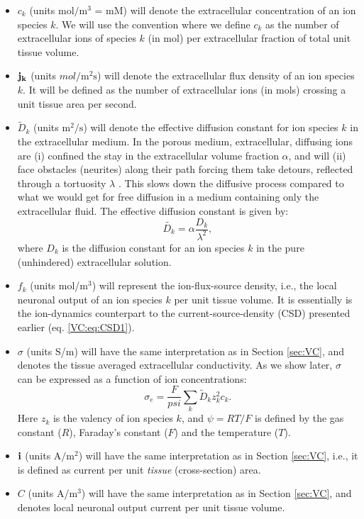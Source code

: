 \begin{itemize}
\item $c_k$ (units $\mathrm{mol/m^3}$ = mM) will denote the extracellular concentration of an ion species $k$. We will use the convention where we define $c_k$ as the number of extracellular ions of species $k$ (in mol) per extracellular fraction of total unit tissue volume. 

\item ${\bf j_k}$ (units $mol/\mathrm{m^2s}$) will denote the extracellular flux density of an ion species $k$. It will be defined as the number of extracellular ions (in mols) crossing a unit tissue area per second. 

\item $\tilde{D}_k$ (units $\mathrm{m^2/s}$) will denote the effective diffusion constant for ion species $k$ in the extracellular medium. In the porous medium, extracellular, diffusing ions are (i) confined the stay in the extracellular volume fraction $\alpha$, and will (ii) face obstacles (neurites) along their path forcing them take detours, reflected through a tortuosity $\lambda$ \citep{Nicholson1998}. This slows down the diffusive process compared to what we would get for free diffusion in a medium containing only the extracellular fluid. The effective diffusion constant is given by:
\begin{equation}
\tilde{D_k} = \alpha \frac{D_k}{\lambda^2}, 
\label{Eldiff:eq:diffconst}
\end{equation}
where $D_k$ is the diffusion constant for an ion species $k$ in the pure (unhindered) extracellular solution.

\item $f_k$ (units mol/m$^3$) will represent the ion-flux-source density, i.e., the local neuronal output of an ion species $k$ per unit tissue volume. It is essentially is the ion-dynamics counterpart to the current-source-density (CSD) presented earlier (eq. \ref{VC:eq:CSD1}).

\item $\sigma$ (units S/m) will have the same interpretation as in Section \ref{sec:VC}, and denotes the tissue averaged extracellular conductivity. As we show later, $\sigma$ can be expressed as a function of ion concentrations:
\begin{equation}
\sigma_e = \frac{F}{psi}\sum_{k} \tilde{D}_k z_{k}^2 c_{k}.
\label{Eldiff:eq:sigma1}
\end{equation}
Here $z_{k}$ is the valency of ion species $k$, and $\psi=RT/F$ is defined by the gas constant ($R$), Faraday's constant ($F$) and the temperature ($T$).

\item  ${\bf i}$ (units $\mathrm{A/m^2}$) will have the same interpretation as in Section \ref{sec:VC}, i.e., it is defined as current per unit \textit{tissue} (cross-section) area.

\item $C$ (units A/m$^3$) will have the same interpretation as in Section \ref{sec:VC}, and denotes local neuronal output current per unit tissue volume.

\end{itemize}

